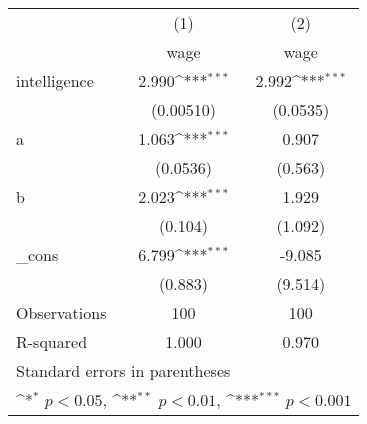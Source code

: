 {
\def\sym#1{\ifmmode^{#1}\else\(^{#1}\)\fi}
\begin{tabular}{l*{2}{c}}
\hline\hline
            &\multicolumn{1}{c}{(1)}&\multicolumn{1}{c}{(2)}\\
            &\multicolumn{1}{c}{wage}&\multicolumn{1}{c}{wage}\\
\hline
intelligence&       2.990\sym{***}&       2.992\sym{***}\\
            &   (0.00510)         &    (0.0535)         \\
[1em]
a           &       1.063\sym{***}&       0.907         \\
            &    (0.0536)         &     (0.563)         \\
[1em]
b           &       2.023\sym{***}&       1.929         \\
            &     (0.104)         &     (1.092)         \\
[1em]
\_cons      &       6.799\sym{***}&      -9.085         \\
            &     (0.883)         &     (9.514)         \\
\hline
Observations&         100         &         100         \\
R-squared   &       1.000         &       0.970         \\
\hline\hline
\multicolumn{3}{l}{\footnotesize Standard errors in parentheses}\\
\multicolumn{3}{l}{\footnotesize \sym{*} \(p<0.05\), \sym{**} \(p<0.01\), \sym{***} \(p<0.001\)}\\
\end{tabular}
}

